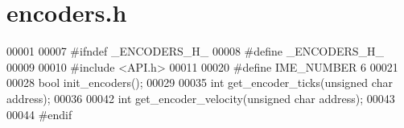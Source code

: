 \section{encoders.\+h}
\label{encoders_8h_source}

\begin{DoxyCode}
00001 
00007 \textcolor{preprocessor}{#ifndef \_ENCODERS\_H\_}
00008 \textcolor{preprocessor}{#define \_ENCODERS\_H\_}
00009 
00010 \textcolor{preprocessor}{#include <API.h>}
00011 
00020 \textcolor{preprocessor}{#define IME\_NUMBER 6}
00021 
00028 \textcolor{keywordtype}{bool} init_encoders();
00029 
00035 \textcolor{keywordtype}{int} get_encoder_ticks(\textcolor{keywordtype}{unsigned} \textcolor{keywordtype}{char} address);
00036 
00042 \textcolor{keywordtype}{int} get_encoder_velocity(\textcolor{keywordtype}{unsigned} \textcolor{keywordtype}{char} address);
00043 
00044 \textcolor{preprocessor}{#endif}
\end{DoxyCode}
